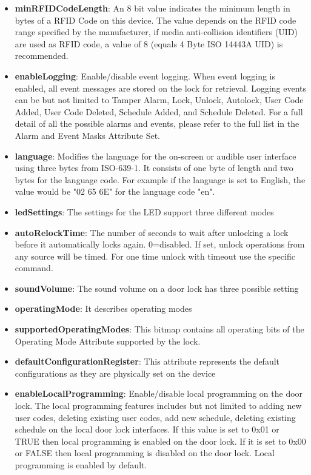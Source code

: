 \begin{itemize}
\item \textbf{minRFIDCodeLength}: An 8 bit value indicates the minimum length in bytes of a RFID Code on this device. The value depends on the RFID code range specified by the manufacturer, if media anti-collision identifiers (UID) are used as RFID code, a value of 8 (equals 4 Byte ISO 14443A UID) is recommended.
\item \textbf{enableLogging}: Enable/disable event logging. When event logging is enabled, all event messages are stored on the lock for retrieval. Logging events can be but not limited to Tamper Alarm, Lock, Unlock, Autolock, User Code Added, User Code Deleted, Schedule Added, and Schedule Deleted. For a full detail of all the possible alarms and events, please refer to the full list in the Alarm and Event Masks Attribute Set.
\item \textbf{language}: Modifies the language for the on-screen or audible user interface using three bytes from ISO-639-1. It consists of one byte of length and two bytes for the language code. For example if the language is set to English, the value would be "02 65 6E" for the language code "en".
\item \textbf{ledSettings}: The settings for the LED support three different modes
\item \textbf{autoRelockTime}: The number of seconds to wait after unlocking a lock before it automatically locks again. 0=disabled. If set, unlock operations from any source will be timed. For one time unlock with timeout use the specific command.
\item \textbf{soundVolume}: The sound volume on a door lock has three possible setting
\item \textbf{operatingMode}: It describes operating modes
\item \textbf{supportedOperatingModes}: This bitmap contains all operating bits of the Operating Mode Attribute supported by the lock.
\item \textbf{defaultConfigurationRegister}: This attribute represents the default configurations as they are physically set on the device
\item \textbf{enableLocalProgramming}: Enable/disable local programming on the door lock. The local programming features includes but not limited to adding new user codes, deleting existing user codes, add new schedule, deleting existing schedule on the local door lock interfaces. If this value is set to 0x01 or TRUE then local programming is enabled on the door lock. If it is set to 0x00 or FALSE then local programming is disabled on the door lock. Local programming is enabled by default.

\end{itemize}
